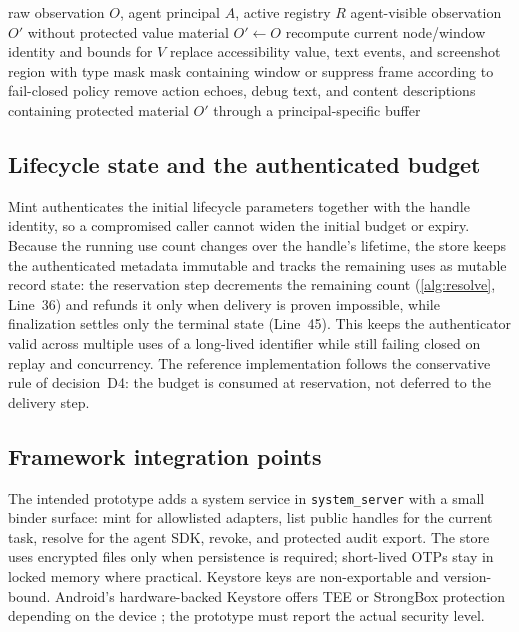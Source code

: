 \begin{algorithm}[htbp]
\caption{Observation Redactor}
\label{alg:redact}
\begin{algorithmic}[1]
\Require raw observation $O$, agent principal $A$, active registry $R$
\Ensure agent-visible observation $O'$ without protected value material
\State $O'\gets O$
  \State recompute current node/window identity and bounds for $V$
    \State replace accessibility value, text events, and screenshot region with type mask
  \Else
    \State mask containing window or suppress frame according to fail-closed policy
  \EndIf
  \State remove action echoes, debug text, and content descriptions containing protected material
\EndFor
\State \Return $O'$ through a principal-specific buffer
\end{algorithmic}
\end{algorithm}

\subsection{Lifecycle state and the authenticated budget}
\label{sec:lifecycle-budget}

Mint authenticates the initial lifecycle parameters together with the handle identity, so a compromised caller cannot widen the initial budget or expiry. Because the running use count changes over the handle's lifetime, the store keeps the authenticated metadata immutable and tracks the remaining uses as mutable record state: the reservation step decrements the remaining count (\cref{alg:resolve}, Line~36) and refunds it only when delivery is proven impossible, while finalization settles only the terminal state (Line~45). This keeps the authenticator valid across multiple uses of a long-lived identifier while still failing closed on replay and concurrency. The reference implementation follows the conservative rule of decision~D4: the budget is consumed at reservation, not deferred to the delivery step.

\subsection{Framework integration points}

The intended prototype adds a system service in \texttt{system\_server} with a small binder surface: mint for allowlisted adapters, list public handles for the current task, resolve for the agent SDK, revoke, and protected audit export. The store uses encrypted files only when persistence is required; short-lived OTPs stay in locked memory where practical. Keystore keys are non-exportable and version-bound. Android's hardware-backed Keystore offers TEE or StrongBox protection depending on the device \cite{androidKeystore,androidKeyAttestation}; the prototype must report the actual security level.


